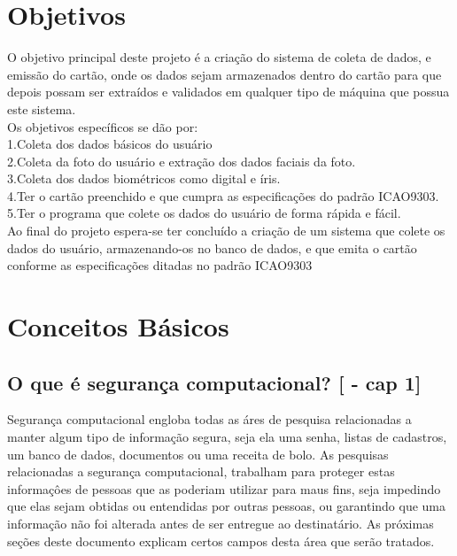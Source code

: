 \documentclass{article}
\begin{document}
	\section{Objetivos}
		\begin{justify}
			
				\hspace{2cm}O objetivo principal deste projeto é a criação do sistema de coleta de dados, e emissão do cartão, onde os dados sejam armazenados dentro do cartão para que depois possam ser extraídos e validados em qualquer tipo de máquina que possua este sistema.\\
				\hspace*{2cm}Os objetivos específicos se dão por:\\
					\hspace*{3cm}1.Coleta dos dados básicos do usuário\cite{SASSO}\\
					\hspace*{3cm}2.Coleta da foto do usuário e extração dos dados faciais da foto\cite{ISO}\cite{ICAO}.\\
					\hspace*{3cm}3.Coleta dos dados biométricos como digital e íris.\\
					\hspace*{3cm}4.Ter o cartão preenchido e que cumpra as especificações do padrão ICAO9303.\cite{ICAO}\\
					\hspace*{3cm}5.Ter o programa que colete os dados do usuário de forma rápida e fácil.\\
				 \hspace*{2cm}Ao final do projeto espera-se ter concluído a criação de um sistema que colete os dados do usuário, armazenando-os no banco de dados, e que emita o cartão conforme as especificações ditadas no padrão ICAO9303

			
		\end{justify}

	\section {Conceitos Básicos}
		\subsection{O que é segurança computacional? [\cite{STALLINS} - cap 1]}
			\begin{justify}
			
				\hspace{2cm} Segurança computacional engloba todas as áres de pesquisa relacionadas a manter algum tipo de informação segura, seja ela uma senha, listas de cadastros, um banco de dados, documentos ou uma receita de bolo. As pesquisas relacionadas a segurança computacional, trabalham para proteger estas informaçôes de pessoas que as poderiam utilizar para maus fins, seja impedindo que elas sejam obtidas ou entendidas por outras pessoas, ou garantindo que uma informação não foi alterada antes de ser entregue ao destinatário. As próximas seções deste documento explicam certos campos desta área que serão tratados.
			
			\end{justify}
\end{document}
